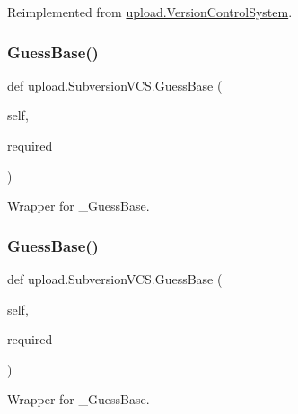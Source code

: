 Reimplemented from \mbox{\hyperlink{classupload_1_1_version_control_system_a56a60e56aa9aff3df4001d2f84cab884}{upload.\+Version\+Control\+System}}.

\mbox{\label{classupload_1_1_subversion_v_c_s_a7d22d459469a757270502ce0dccacbd2}} 
\subsubsection{\texorpdfstring{GuessBase()}{GuessBase()}\hspace{0.1cm}{\footnotesize\ttfamily [1/2]}}
{\footnotesize\ttfamily def upload.\+Subversion\+V\+C\+S.\+Guess\+Base (\begin{DoxyParamCaption}\item[{}]{self,  }\item[{}]{required }\end{DoxyParamCaption})}

\begin{DoxyVerb}Wrapper for _GuessBase.\end{DoxyVerb}
 \mbox{\label{classupload_1_1_subversion_v_c_s_a7d22d459469a757270502ce0dccacbd2}} 
\subsubsection{\texorpdfstring{GuessBase()}{GuessBase()}\hspace{0.1cm}{\footnotesize\ttfamily [2/2]}}
{\footnotesize\ttfamily def upload.\+Subversion\+V\+C\+S.\+Guess\+Base (\begin{DoxyParamCaption}\item[{}]{self,  }\item[{}]{required }\end{DoxyParamCaption})}

\begin{DoxyVerb}Wrapper for _GuessBase.\end{DoxyVerb}
 \mbox{\label{classupload_1_1_subversion_v_c_s_a340d269b74386ac863636f6b0683d9f4}} 
